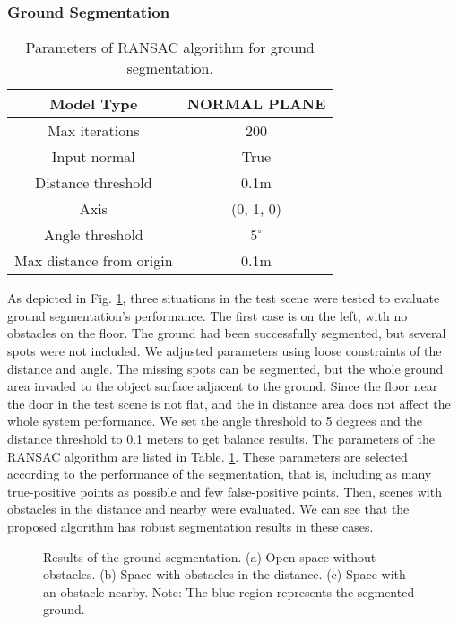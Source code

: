 \documentclass{ieeeaccess}
\begin{document}
\subsubsection{Ground Segmentation}

\begin{table}[t]
\centering
\caption{Parameters of RANSAC algorithm for ground segmentation.}
\label{tab:ground-segmentation-parameters}
\begin{tabular}{|c|c|}
\hline
Model Type        &  NORMAL PLANE    \\ \hline
Max iterations       &  200    \\ \hline
Input normal        &  True    \\ \hline
Distance threshold        &  0.1m    \\ \hline
Axis       &  (0, 1, 0)    \\ \hline
Angle threshold        &  $5^\circ$    \\ \hline
Max distance from origin        &  0.1m    \\ \hline
\end{tabular}
\end{table}


  As depicted in Fig. \ref{fig:groundsegmentation}, three situations in the test scene were tested to evaluate ground segmentation's performance. The first case is on the left, with no obstacles on the floor. The ground had been successfully segmented, but several spots were not included. We adjusted parameters using loose constraints of the distance and angle. The missing spots can be segmented, but the whole ground area invaded to the object surface adjacent to the ground.  Since the floor near the door in the test scene is not flat, and the in distance area does not affect the whole system performance. We set the angle threshold to 5 degrees and the distance threshold to 0.1 meters to get balance results. The parameters of the RANSAC algorithm are listed in Table. \ref{tab:ground-segmentation-parameters}. These parameters are selected according to the performance of the segmentation, that is, including as many true-positive points as possible and few false-positive points. Then, scenes with obstacles in the distance and nearby were evaluated. We can see that the proposed algorithm has robust segmentation results in these cases. 

\begin{figure}[t]
    \centering
    \caption{Results of the ground segmentation. (a) Open space without obstacles. (b) Space with obstacles in the distance. (c) Space with an obstacle nearby. Note: The blue region represents the segmented ground.}%
    \label{fig:groundsegmentation}
\end{figure}
\end{document}
